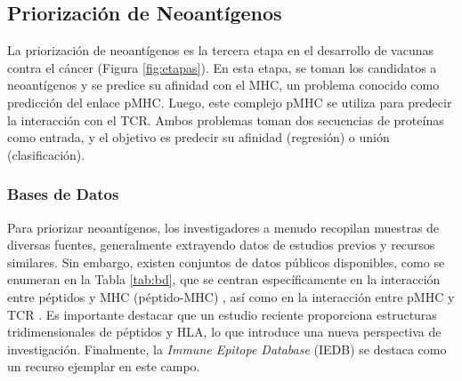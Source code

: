 \subsection{Priorización de Neoantígenos}

La priorización de neoantígenos es la tercera etapa en el desarrollo de vacunas contra el cáncer (Figura \ref{fig:etapas}). En esta etapa, se toman los candidatos a neoantígenos y se predice su afinidad con el MHC, un problema conocido como predicción del enlace pMHC. Luego, este complejo pMHC se utiliza para predecir la interacción con el TCR. Ambos problemas toman dos secuencias de proteínas como entrada, y el objetivo es predecir su afinidad (regresión) o unión (clasificación). 


\subsubsection{Bases de Datos}

Para priorizar neoantígenos, los investigadores a menudo recopilan muestras de diversas fuentes, generalmente extrayendo datos de estudios previos y recursos similares. Sin embargo, existen conjuntos de datos públicos disponibles, como se enumeran en la Tabla \ref{tab:bd}, que se centran específicamente en la interacción entre péptidos y MHC (péptido-MHC)  \citep{wu2018tsnadb, zhou2019neopeptide, tan2020dbpepneo, lu2022dbpepneo2}, así como en la interacción entre pMHC y TCR \citep{shugay2018vdjdb, bagaev2020vdjdb}. Es importante destacar que un estudio reciente proporciona estructuras tridimensionales de péptidos y HLA, lo que introduce una nueva perspectiva de investigación. Finalmente, la \textit{Immune Epitope Database} (IEDB) \citep{vita2019immune} se destaca como un recurso ejemplar en este campo.

